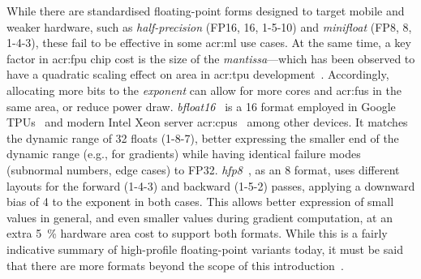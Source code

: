 While there are standardised floating-point forms designed to target mobile and weaker hardware, such as \emph{half-precision} (FP16, \qty{16}{\bit}, 1-5-10) and \emph{minifloat} (FP8, \qty{8}{\bit}, 1-4-3), these fail to be effective in some \gls{acr:ml} use cases.
At the same time, a key factor in \gls{acr:fpu} chip cost is the size of the \emph{mantissa}---which has been observed to have a quadratic scaling effect on area in \gls{acr:tpu} development~\parencite{bfloat16-blog}.
Accordingly, allocating more bits to the \emph{exponent} can allow for more cores and \glspl{acr:fu} in the same area, or reduce power draw.
\emph{bfloat16}~\parencite{bfloat16-blog} is a \qty{16}{\bit} format employed in Google TPUs~\parencite{DBLP:journals/sigops/XieDMKVZT18} and modern Intel Xeon server \glspl{acr:cpu}~\parencite{intel-bfloat} among other devices.
It matches the dynamic range of \qty{32}{\bit} floats (1-8-7), better expressing the smaller end of the dynamic range (e.g., for gradients) while having identical failure modes (subnormal numbers, edge cases) to FP32.
\emph{hfp8}~\parencite{DBLP:conf/nips/SunCCWVSCZG19}, as an \qty{8}{\bit} format, uses different layouts for the forward (1-4-3) and backward (1-5-2) passes, applying a downward bias of \num{4} to the exponent in both cases.
This allows better expression of small values in general, and even smaller values during gradient computation, at an extra \qty{5}{\percent} hardware area cost to support both formats.
While this is a fairly indicative summary of high-profile floating-point variants today, it must be said that there are more formats beyond the scope of this introduction~\parencite{DBLP:journals/corr/abs-2007-01530}.

